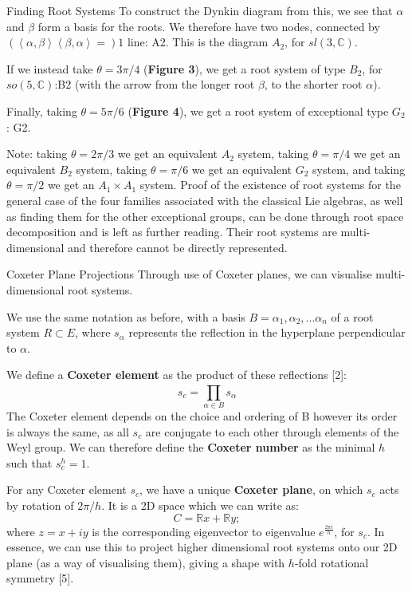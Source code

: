\documentclass[final]{beamer}
\newlength{\colwidth}
\begin{document}
\begin{frame}[t]
\begin{columns}[t]
\begin{column}{\colwidth}
\begin{block}{Finding Root Systems}
To construct the Dynkin diagram from this, we see that $\alpha$ and $\beta$ form a basis for the roots. We therefore have two nodes, connected by $(\left\langle \alpha,\beta \right\rangle\left\langle  \beta,\alpha\right\rangle=) 1$ line: \dynkin A2. This is the diagram $A_{2}$, for $sl(3,\mathbb{C})$.

If we instead take $\theta=3\pi/4$ (\textbf{Figure 3}), we get a root system of type $B_{2}$, for $so(5,\mathbb{C})$:\dynkin B2 (with the arrow from the longer root $\beta$, to the shorter root $\alpha$).
  
Finally, taking $\theta=5\pi/6$ (\textbf{Figure 4}), we get a root system of exceptional type $G_{2}$: \dynkin G2.
 
Note: taking $\theta=2\pi/3$ we get an equivalent $A_{2}$ system, taking $\theta=\pi/4$ we get an equivalent $B_{2}$ system, taking $\theta=\pi/6$ we get an equivalent $G_{2}$ system, and taking $\theta=\pi/2$ we get an $A_{1}\times A_{1}$ system.
Proof of the existence of root systems for the general case of the four families associated with the classical Lie algebras, as well as finding them for the other exceptional groups, can be done through root space decomposition and is left as further reading. Their root systems are multi-dimensional and therefore cannot be directly represented.
\end{block}
\begin{block}{Coxeter Plane Projections}
Through use of Coxeter planes, we can visualise multi-dimensional root systems.

We use the same notation as before, with a basis $B={\alpha_{1},\alpha_{2},...\alpha_{n}}$ of a root system $R \subset E$, where $s_{\alpha}$ represents the reflection in the hyperplane perpendicular to $\alpha$. 

We define a \textbf{Coxeter element} as the product of these reflections [2]:
$$  s_{c}=\prod_{\alpha\in B}^{}s_{\alpha}
$$
The Coxeter element depends on the choice and ordering of B however its order is always the same, as all $s_{c}$ are conjugate to each other through elements of the Weyl group. We can therefore define the \textbf{Coxeter number} as the minimal $h$ such that $s_{c}^{h}=1$. 

For any Coxeter element $s_{c}$, we have a unique \textbf{Coxeter plane}, on which $s_{c}$ acts by rotation of $2\pi/h$. It is a 2D space which we can write as:
$$ C=\mathbb{R}x+\mathbb{R}y;
$$
where $z=x+iy$ is the corresponding eigenvector to eigenvalue $e^{\frac{2\pi i}{h}}$, for $s_{c}$. In essence, we can use this to project higher dimensional root systems onto our 2D plane (as a way of visualising them), giving a shape with $h$-fold rotational symmetry [5]. 


\end{block}
\end{column}
\end{columns}
\end{frame}
\end{document}
